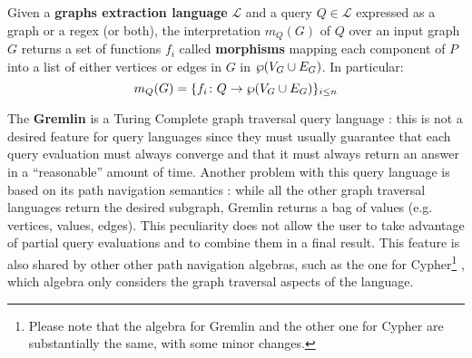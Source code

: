 \begin{definition}\label{sec:graphamatch}
	Given a \textbf{graphs extraction language} $\mathcal{L}$ and a query $Q\in\mathcal{L}$  expressed as a graph or a regex (or both),
	the interpretation $m_Q(G)$ of $Q$ over an input graph $G$ returns a set of functions
	$f_i$ called \textbf{morphisms}  mapping each component of $P$  into a list of either vertices or edges in $G$ in $\wp(V_G\cup E_G)$. In particular:
	\[m_Q(G)=\{f_i\colon Q\to  \wp(V_G\cup E_G)\}_{i\leq n}\]
	
\end{definition}

The \textbf{Gremlin} is a Turing Complete graph traversal query language \cite{Rodriguez15}:
this is not a desired feature for query languages since they must usually  guarantee that
each query evaluation must always converge and that it must always return an answer in a ``reasonable'' amount of time. 
Another problem with this query language is based on its path navigation semantics \cite{ThakkarPAV17}:
while all the other graph traversal languages return the desired subgraph, Gremlin returns
a bag of values (e.g. vertices, values, edges). This peculiarity does not allow the user to take advantage
of partial query evaluations and to combine them in a final result. This feature is
also shared by other other path navigation algebras, such as the one for Cypher\footnote{Please note that the algebra \cite{ThakkarPAV17} for Gremlin and the other one \cite{Neo4jAlg,MartonSV17} for Cypher are substantially the same, with some minor changes.} \cite{Neo4jAlg,MartonSV17}, which algebra only considers  the graph traversal aspects of the language.

